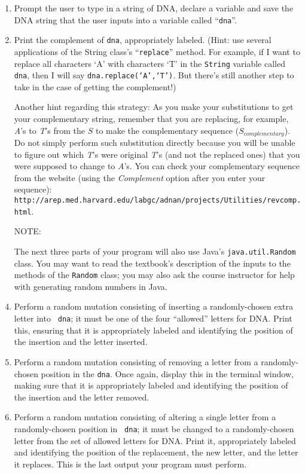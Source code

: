 \documentclass[11pt]{article}
\newcommand{\url}[1]{\lstinline{#1}}
\begin{document}
\begin{enumerate}

\item Prompt the user to type in a string of DNA, declare a variable and save the DNA string that the user inputs into a
  variable called ``{\tt dna}''.

\item Print the complement of {\tt dna}, appropriately labeled.  (Hint: use several applications of the String class's
  ``{\tt replace}'' method. For example, if I want to replace all characters `A' with characters `T' in the {\tt String}
  variable called {\tt dna}, then I will say {\tt dna.replace(`A',`T')}. But there's still another step to take in the
  case of getting the complement!)

Another hint regarding this strategy: As you make your substitutions to get your complementary string, remember that you
are replacing, for example, \emph{A}'s to \emph{T}'s from the $S$ to make the complementary sequence
($S_{complementary}$). Do not simply perform such substitution directly because you will be unable to figure out which
\emph{T}'s were original \emph{T}'s (and not the replaced ones) that you were supposed to change to \emph{A}'s. You can
check your complementary sequence from the website  (using the \emph{Complement} option after you enter your sequence):
\url{http://arep.med.harvard.edu/labgc/adnan/projects/Utilities/revcomp.html}.

\item[NOTE:]

  The next three parts of your program will also use Java's {\tt java.util.Random} class. You may want to read the
  textbook's description of the inputs to the methods of the {\tt Random} class; you may also ask the course instructor
  for help with generating random numbers in Java.

\item \begin{sloppypar} Perform a random mutation consisting of inserting a randomly-chosen extra letter into {\tt
  dna}; it must be one of the four ``allowed'' letters for DNA. Print this, ensuring that it is appropriately
labeled and identifying the position of the insertion and the letter inserted. \end{sloppypar}

\item Perform a random mutation consisting of removing a letter from a randomly-chosen position in the {\tt dna}.
  Once again, display this in the terminal window, making sure that it is appropriately labeled and identifying the
  position of the insertion and the letter removed.

\item Perform a random mutation consisting of altering a single letter from a randomly-chosen position in {\tt
  dna}; it must be changed to a randomly-chosen letter from the set of allowed letters for DNA. Print it,
  appropriately labeled and identifying the position of the replacement, the new letter, and the letter it replaces.
  This is the last output your program must perform.

\end{enumerate}
\end{document}
